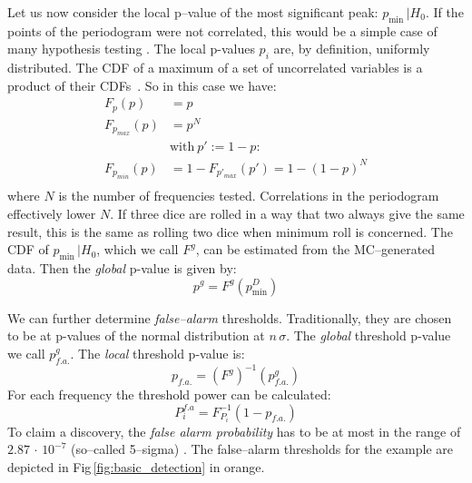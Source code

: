 
Let us now consider the local p--value of the most significant peak: $p_{\mathrm{min}} \, | H_0$. If the points of the periodogram were not correlated, this would be a simple case of many hypothesis testing \cite{Algeri2016}. The local p-values $p_i$ are, by definition, uniformly distributed. The CDF of a maximum of a set of uncorrelated variables is a product of their CDFs~\cite{Papoulis2002}. So in this case we have:
\begin{align}
  F_p(p) &= p \\
  F_{p_{max}}(p) &= p^N \\
  &\text{with}\ p' := 1 - p :\\
  F_{p_{min}}(p) &= 1 - F_{p'_{max}}(p') = 1 - (1 - p)^N \label{eq:Fpmin}\\
\end{align}
where $N$ is the number of frequencies tested. Correlations in the periodogram effectively lower $N$. If three dice are rolled in a way that two always give the same result, this is the same as rolling two dice when minimum roll is concerned. The CDF of $p_{\mathrm{min}} \, | H_0$, which we call $F^g$, can be estimated from the MC--generated data. Then the \emph{global} p-value is given by:
\begin{equation}
  p^g = F^g(p_{\mathrm{min}}^D)
\end{equation}

We can further determine \emph{false--alarm} thresholds. Traditionally, they are chosen to be at p-values of the normal distribution at $n \,\sigma$. The \emph{global} threshold p-value we call $p^g_{f.a.}$. The \emph{local} threshold p-value is:
\begin{equation}
  p_{f.a.} = \left( F^g \right)^{-1}(p^g_{f.a.})
\end{equation}
For each frequency the threshold power can be calculated:
\begin{equation}
  P^{f.a}_i = F_{P_i}^{-1}(1 - p_{f.a.})
\end{equation}
To claim a discovery, the \emph{false alarm probability} has to be at most in the range of $2.87\,\cdot\,10^{-7}$ (so--called 5--sigma) \cite{PDG2016}. The false--alarm thresholds for the example are depicted in Fig\,\ref{fig:basic_detection} in orange.

